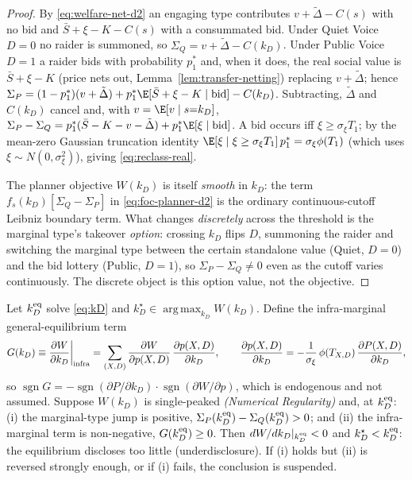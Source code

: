 \begin{proof}
By \eqref{eq:welfare-net-d2} an engaging type contributes $v+\tilde\Delta-C(s)$
with no bid and $\bar S+\xi-K-C(s)$ with a consummated bid. Under Quiet Voice
$D=0$ no raider is summoned, so $\Sigma_Q=v+\tilde\Delta-C(k_D)$. Under Public
Voice $D=1$ a raider bids with probability $p_1^{\ast}$ and, when it does, the
real social value is $\bar S+\xi-K$ (price nets out,
Lemma~\ref{lem:transfer-netting}) replacing $v+\tilde\Delta$; hence
$\Sigma_P=(1-p_1^{\ast})(v+\tilde\Delta)
 +p_1^{\ast}\E[\bar S+\xi-K\mid\text{bid}]-C(k_D)$. Subtracting, $\tilde\Delta$
and $C(k_D)$ cancel and, with $v=\E[v\mid s{=}k_D]$,
$\Sigma_P-\Sigma_Q=p_1^{\ast}(\bar S-K-v-\tilde\Delta)
 +p_1^{\ast}\E[\xi\mid\text{bid}]$. A bid occurs iff $\xi\ge\sigma_\xi T_1$; by
the mean-zero Gaussian truncation identity
$\E[\xi\mid\xi\ge\sigma_\xi T_1]\,p_1^{\ast}=\sigma_\xi\phi(T_1)$ (which uses
$\xi\sim N(0,\sigma_\xi^2)$), giving \eqref{eq:reclass-real}.

The planner objective $W(k_D)$ is itself \emph{smooth} in $k_D$: the term
$f_s(k_D)[\Sigma_Q-\Sigma_P]$ in \eqref{eq:foc-planner-d2} is the ordinary
continuous-cutoff Leibniz boundary term. What changes \emph{discretely} across the
threshold is the marginal type's takeover \emph{option}: crossing $k_D$ flips $D$,
summoning the raider and switching the marginal type between the certain
standalone value (Quiet, $D{=}0$) and the bid lottery (Public, $D{=}1$), so
$\Sigma_P-\Sigma_Q\neq0$ even as the cutoff varies continuously. The discrete
object is this option value, not the objective.
\end{proof}

\begin{proposition}
\label{prop:disclosure-wedge}
Let $k_D^{\textup{eq}}$ solve \eqref{eq:kD} and
$k_D^{\star}\in\operatorname*{arg\,max}_{k_D}W(k_D)$. Define the infra-marginal
general-equilibrium term
\begin{equation}
G(k_D)\equiv\frac{\partial W}{\partial k_D}\bigg|_{\textup{infra}}
 =\sum_{(X,D)}\frac{\partial W}{\partial p(X,D)}\,
   \frac{\partial p(X,D)}{\partial k_D},\qquad
\frac{\partial p(X,D)}{\partial k_D}
 =-\frac{1}{\sigma_\xi}\,\phi(T_{X,D})\,\frac{\partial P(X,D)}{\partial k_D},
\label{eq:G-term}
\end{equation}
so $\operatorname{sgn}G=-\operatorname{sgn}(\partial P/\partial k_D)\cdot
\operatorname{sgn}(\partial W/\partial p)$, which is endogenous and not assumed.
Suppose $W(k_D)$ is single-peaked \emph{(Numerical Regularity)} and, at
$k_D^{\textup{eq}}$:
\textup{(i)} the marginal-type jump is positive,
$\Sigma_P(k_D^{\textup{eq}})-\Sigma_Q(k_D^{\textup{eq}})>0$; and
\textup{(ii)} the infra-marginal term is non-negative,
$G(k_D^{\textup{eq}})\ge0$.
Then $dW/dk_D|_{k_D^{\textup{eq}}}<0$ and $k_D^{\star}<k_D^{\textup{eq}}$: the
equilibrium discloses too little (underdisclosure). If (i) holds but (ii) is
reversed strongly enough, or if (i) fails, the conclusion is suspended.
\end{proposition}

